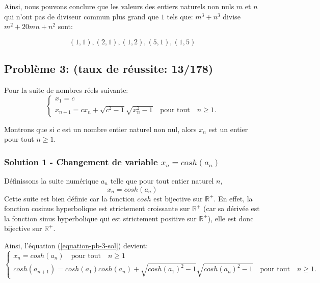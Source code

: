 \documentclass[12pt,a4paper,article]{memoir}
\begin{document}
\bigskip

Ainsi, nous pouvons conclure que les valeurs des entiers naturels non nuls $m$ et $n$ qui n'ont pas de diviseur commun plus grand que $1$ tels que: $m^3 + n^3$ divise $m^2+20mn+n^2$ sont: 

\bigskip

\begin{equation}
(1,1), (2, 1), (1, 2), (5, 1), (1, 5)
\label{equation-pb-2-sol-1-res}
\end{equation}


\subsection{Problème 3: (taux de réussite: 13/178)}
Pour la suite de nombres réels suivante:
\begin{equation}
\left\{
	\begin{array}{l}
	x_1 = c \\
	x_{n+1} = cx_{n} + \sqrt{c^2 - 1}\sqrt{x_{n}^2 - 1}  \quad \textrm{pour tout} \quad n \geq 1.
	\end{array}
\right.
\label{equation-pb-3-sol}
\end{equation}

Montrons que si $c$ est un nombre entier naturel non nul, alors $x_{n}$ est un entier pour tout $n \geq 1$.
\subsubsection{Solution 1 - Changement de variable $x_n = cosh(a_n)$}
Définissons la suite numérique $a_n$ telle que pour tout entier naturel $n$,
\[x_n = cosh(a_n)\]
Cette suite est bien définie car la fonction $cosh$ est bijective sur $\mathbb{R^{+}}$.
En effet, la fonction cosinus hyperbolique est strictement croissante sur $\mathbb{R^{+}}$ (car sa dérivée est la fonction sinus hyperbolique qui est strictement positive sur $\mathbb{R^{+}}$), elle est donc bijective sur $\mathbb{R^{+}}$.

\bigskip

Ainsi, l'équation (\ref{equation-pb-3-sol}) devient:
\begin{equation}
\left\{
	\begin{array}{l}
	x_n = cosh(a_n) \quad \textrm{pour tout} \quad n \geq 1\\
	cosh(a_{n+1}) = cosh(a_1)cosh(a_{n}) + \sqrt{cosh(a_1)^2 - 1}\sqrt{cosh(a_{n})^2 - 1}  \quad \textrm{pour tout} \quad n \geq 1.
	\end{array}
\right.
\label{equation-pb-3-sol-cosh}
\end{equation}
\end{document}
